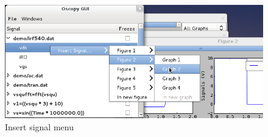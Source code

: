 \documentclass[a4paper,11pt]{article}
\begin{document}
\begin{figure}[htbp]
  \begin{minipage}{0.95\linewidth}
    \includegraphics[scale=.5]{../png/ioscopy-insert.png}
    \caption{Insert signal menu}
    \label{fig:insert}
  \end{minipage}

\end{figure}
\end{document}
